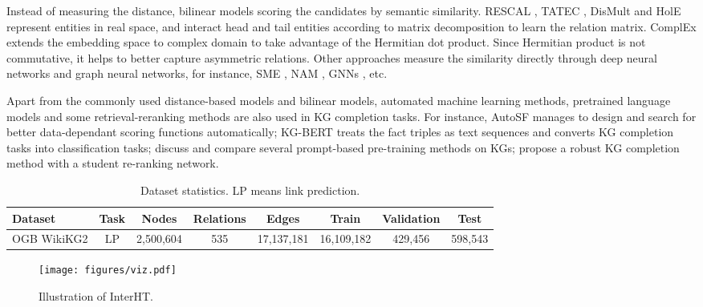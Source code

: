 \documentclass[11pt]{article}
\begin{document}
Instead of measuring the distance, bilinear models scoring the candidates by semantic similarity. RESCAL \cite{10.5555/3104482.3104584}, TATEC \cite{10.5555/3120260.3120289}, DisMult \cite{yang2014embedding} and HolE \cite{10.5555/3016100.3016172} represent entities in real space, and interact head and tail entities according to matrix decomposition to learn the relation matrix. ComplEx \cite{trouillon2016complex} extends the embedding space to complex domain to take advantage of the Hermitian dot product. Since Hermitian product is not commutative, it helps to better capture asymmetric relations. Other approaches measure the similarity directly through deep neural networks and graph neural networks, for instance, SME \cite{10.1007/s10994-013-5363-6}, NAM \cite{DBLP:journals/corr/Liu0LWH16}, GNNs \cite{li2016gated, 10.5555/3305381.3305512, xu2018how}, etc. 

Apart from the commonly used distance-based models and bilinear models, automated machine learning methods, pretrained language models and some retrieval-reranking methods are also used in KG completion tasks. For instance, AutoSF \cite{zhang2020autosf} manages to design and search for better data-dependant scoring functions automatically; KG-BERT \cite{DBLP:journals/corr/abs-1909-03193} treats the fact triples as text sequences and converts KG completion tasks into classification tasks;  discuss and compare several prompt-based pre-training methods on KGs;  propose a robust KG completion method with a student re-ranking network.  

\begin{table*}[!tp]
\begin{center}
\begin{tabular}{lccccccc}
\toprule
Dataset & Task & Nodes & Relations & Edges & Train & Validation & Test \\
\midrule
OGB WikiKG2 & LP & 2,500,604 & 535 & 17,137,181 & 16,109,182 & 429,456 & 598,543 \\
\bottomrule
\end{tabular}\end{center}
\caption{Dataset statistics. LP means link prediction.}\label{dataset}
\end{table*}

\begin{figure*}[t]
\begin{center}
\texttt{[image: figures/viz.pdf]}
\caption{Illustration of InterHT.}\label{interht}
\end{center}
\end{figure*}
\end{document}
